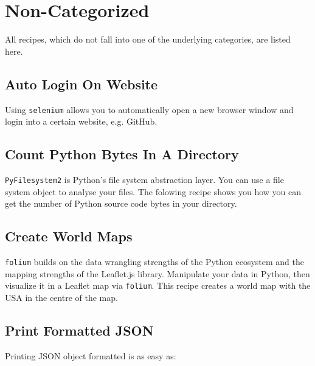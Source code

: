
\section{Non-Categorized}

All recipes, which do not fall into one of the underlying categories, are listed here.

\subsection{Auto Login On Website}

Using \lstinline{selenium} allows you to automatically open a new browser window and login into a certain website, e.g. GitHub.




\subsection{Count Python Bytes In A Directory}

\lstinline{PyFilesystem2} is Python's file system abstraction layer.
You can use a file system object to analyse your files.
The folowing recipe shows you how you can get the number of Python source code bytes in your directory.




\subsection{Create World Maps}

\lstinline{folium} builds on the data wrangling strengths of the Python ecosystem and the mapping strengths of the Leaflet.js library.
Manipulate your data in Python, then visualize it in a Leaflet map via \lstinline{folium}.
This recipe creates a world map with the USA in the centre of the map.




\subsection{Print Formatted JSON}

Printing JSON object formatted is as easy as:

